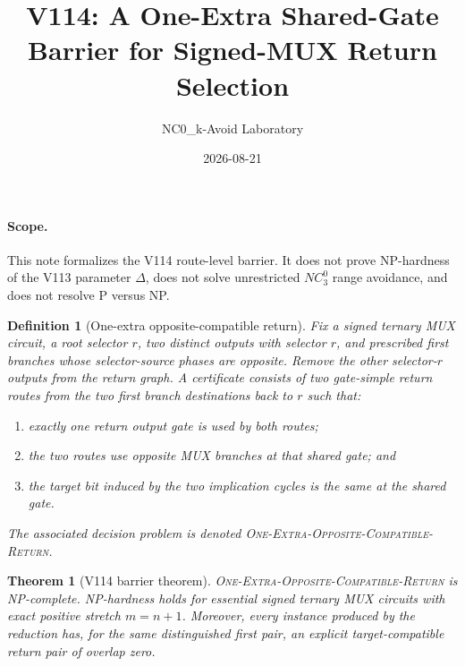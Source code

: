 \documentclass[11pt]{article}
\title{V114: A One-Extra Shared-Gate Barrier for Signed-MUX Return Selection}
\author{NC0\_k-Avoid Laboratory}
\date{2026-08-21}
\newtheorem{theorem}{Theorem}
\newtheorem{definition}{Definition}
\begin{document}
\maketitle

\paragraph{Scope.}
This note formalizes the V114 route-level barrier.  It does not prove
NP-hardness of the V113 parameter $\Delta$, does not solve unrestricted
$NC^0_3$ range avoidance, and does not resolve P versus NP.

\begin{definition}[One-extra opposite-compatible return]
Fix a signed ternary MUX circuit, a root selector $r$, two distinct outputs
with selector $r$, and prescribed first branches whose selector-source phases
are opposite.  Remove the other selector-$r$ outputs from the return graph.
A certificate consists of two gate-simple return routes from the two first
branch destinations back to $r$ such that:
\begin{enumerate}
\item exactly one return output gate is used by both routes;
\item the two routes use opposite MUX branches at that shared gate; and
\item the target bit induced by the two implication cycles is the same at the
shared gate.
\end{enumerate}
The associated decision problem is denoted
\textsc{One-Extra-Opposite-Compatible-Return}.
\end{definition}

\begin{theorem}[V114 barrier theorem]
\textsc{One-Extra-Opposite-Compatible-Return} is NP-complete.  NP-hardness
holds for essential signed ternary MUX circuits with exact positive stretch
$m=n+1$.  Moreover, every instance produced by the reduction has, for the
same distinguished first pair, an explicit target-compatible return pair of
overlap zero.
\end{theorem}
\end{document}
